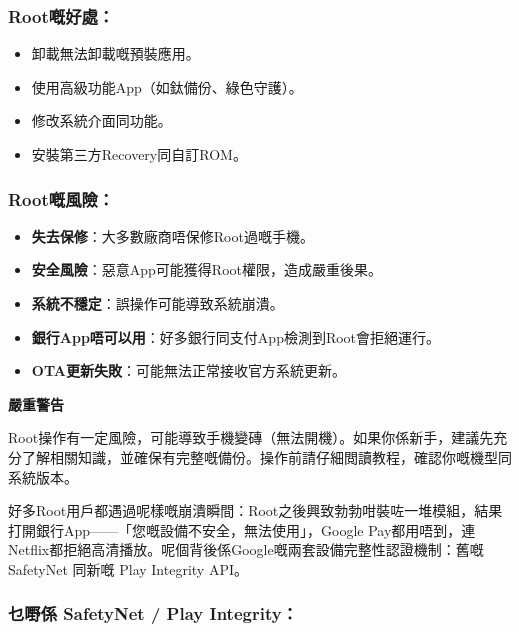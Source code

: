 \subsubsection*{Root嘅好處：}

\begin{itemize}
  \item 卸載無法卸載嘅預裝應用。
  \item 使用高級功能App（如鈦備份、綠色守護）。
  \item 修改系統介面同功能。
  \item 安裝第三方Recovery同自訂ROM。
\end{itemize}

\subsubsection*{Root嘅風險：}

\begin{itemize}
  \item \textbf{失去保修}：大多數廠商唔保修Root過嘅手機。
  \item \textbf{安全風險}：惡意App可能獲得Root權限，造成嚴重後果。
  \item \textbf{系統不穩定}：誤操作可能導致系統崩潰。
  \item \textbf{銀行App唔可以用}：好多銀行同支付App檢測到Root會拒絕運行。
  \item \textbf{OTA更新失敗}：可能無法正常接收官方系統更新。
\end{itemize}

\textbf{嚴重警告}\par

Root操作有一定風險，可能導致手機變磚（無法開機）。如果你係新手，建議先充分了解相關知識，並確保有完整嘅備份。操作前請仔細閲讀教程，確認你嘅機型同系統版本。


好多Root用戶都遇過呢樣嘅崩潰瞬間：Root之後興致勃勃咁裝咗一堆模組，結果打開銀行App——「您嘅設備不安全，無法使用」，Google Pay都用唔到，連Netflix都拒絕高清播放。呢個背後係Google嘅兩套設備完整性認證機制：舊嘅 SafetyNet 同新嘅 Play Integrity API。

\subsubsection*{乜嘢係 SafetyNet / Play Integrity：}

